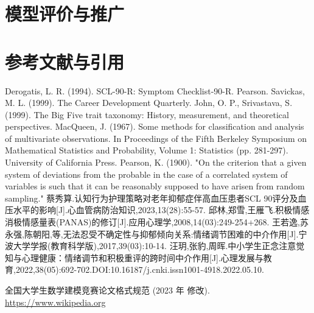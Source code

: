 \documentclass[withoutpreface,bwprint]{cumcmthesis} %
\begin{document}
\section{模型评价与推广}
\section{参考文献与引用}

\begin{thebibliography}{9}%
     Derogatis, L. R. (1994). SCL-90-R: Symptom Checklist-90-R. Pearson.
     Savickas, M. L. (1999). The Career Development Quarterly.
     John, O. P., Srivastava, S. (1999). The Big Five trait taxonomy: History, measurement, and theoretical perspectives.
    MacQueen, J. (1967). Some methods for classification and analysis of multivariate observations. In Proceedings of the Fifth Berkeley Symposium on Mathematical Statistics and Probability, Volume 1: Statistics (pp. 281-297). University of California Press.
    Pearson, K. (1900). "On the criterion that a given system of deviations from the probable in the case of a correlated system of variables is such that it can be reasonably supposed to have arisen from random sampling."
     蔡秀算.认知行为护理策略对老年抑郁症伴高血压患者SCL 90评分及血压水平的影响[J].心血管病防治知识,2023,13(28):55-57.
     邱林,郑雪,王雁飞.积极情感消极情感量表(PANAS)的修订[J].应用心理学,2008,14(03):249-254+268.
     王若逸,苏永强,陈朝阳,等,无法忍受不确定性与抑郁倾向关系:情绪调节困难的中介作用[J].宁波大学学报(教育科学版),2017,39(03):10-14.
     汪玥,张豹,周晖.中小学生正念注意觉知与心理健康：情绪调节和积极重评的跨时间中介作用[J].心理发展与教育,2022,38(05):692-702.DOI:10.16187/j.cnki.issn1001-4918.2022.05.10.

        全国大学生数学建模竞赛论文格式规范 (2023 年 修改).
     \url{https://www.wikipedia.org}
\end{thebibliography}
\end{document}
